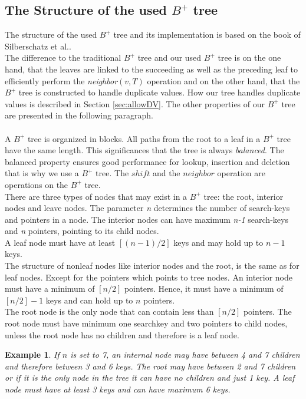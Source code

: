 \documentclass[abstracton,12pt]{scrreprt}
\newtheorem{example}{Example}
\begin{document}
\subsection{The Structure of the used $B^+$ tree}
\label{structureBtree}
The structure of the used $B^+$ tree and its implementation is based on the book of Silberschatz et al.\cite{DatabaseSystemC}. \\
The difference to the traditional $B^+$ tree and our used $B^+$ tree is on the one hand, that the leaves are linked to the succeeding as well as the preceding leaf to efficiently perform the \emph{neighbor}$(v,T)$ operation and on the other hand, that the $B^+$ tree is constructed to handle duplicate values. How our tree handles duplicate values is described in Section \ref{sec:allowDV}. The other properties of our $B^+$ tree are presented in the following paragraph.\\ \\
A $B^+$ tree is organized in blocks. All paths from the root to a leaf in a $B^+$ tree have the same length. This significances that the tree is always \emph{balanced}. The balanced property ensures good performance for lookup, insertion and deletion that is why we use a $B^+$ tree. The $shift$ and the $neighbor$ operation are operations on the $B^+$ tree.\\There are three types of nodes that may exist in a $B^+$ tree: the root, interior nodes and leave nodes. The parameter \emph{n} determines the number of search-keys and pointers in a node. The interior nodes can have maximum \emph{n-1} search-keys and \emph{n} pointers, pointing to its child nodes. \\
A leaf node must have at least $[(n-1)/2]$ keys and may hold up to $n-1$ keys.\\
The structure of nonleaf nodes like interior nodes and the root, is the same as for leaf nodes. Except
for the pointers which points to tree nodes. An interior node must have a minimum of $[n/2]$ pointers. Hence, it must have a minimum of $[n/2]-1$ keys and can hold up to $n$ pointers. \\
The root node is the only node that can contain less than $[n/2]$ pointers. The root node must have minimum one searchkey and two pointers to child nodes, unless the root node has no children and therefore is a leaf node.
\begin{example}
	If $n$ is set to 7, an internal node may have between 4 and 7 children and therefore between 3 and 6 keys. The root may have between 2 and 7 children or if it is the only node in the tree it can have no children and just 1 key. A leaf node must have at least 3 keys and can have maximum 6 keys.
\end{example}
\end{document}
